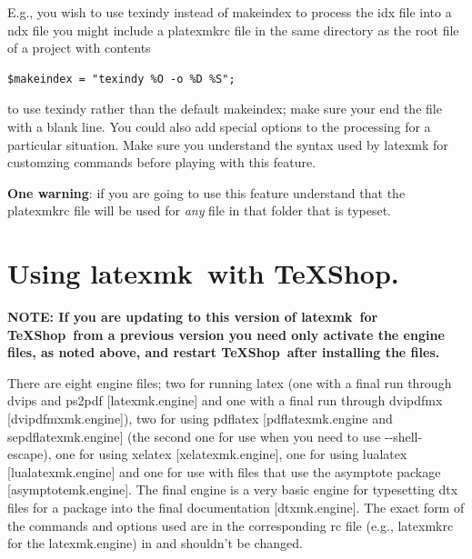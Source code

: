 \documentclass[11pt]{article}
\newcommand{\cmd}[1]{\textsf{#1}}
\newcommand{\TS}{\textsf{\TeX Shop}}
\newcommand{\latexmk}{\textsf{latexmk}}
\begin{document}
E.g., you wish to use \cmd{texindy} instead of \cmd{makeindex} to process the \cmd{idx} file into a \cmd{ndx} file you might include a \cmd{platexmkrc} file in the same directory as the root file of a project with contents
\begin{verbatim}
$makeindex = "texindy %O -o %D %S";
\end{verbatim}
to use \cmd{texindy} rather than the default \cmd{makeindex}; make sure your end the file with a blank line. You could also add special options to the processing for a particular situation. Make sure you understand the syntax used by \cmd{latexmk} for customzing commands before playing with this feature.

\textbf{One warning}: if you are going to use this feature understand that the \cmd{platexmkrc} file will be used for \emph{any} file in that folder that is typeset.

\section{Using \latexmk\ with \TS.}

\textbf{NOTE: If you are updating to this version of \latexmk\ for \TS\ from a previous version you need only activate the engine files, as noted above, and restart \TS\ after installing the files.}

There are eight \cmd{engine} files; two for running \cmd{latex} (one with a final run through \cmd{dvips} and \cmd{ps2pdf} [\cmd{latexmk.engine}] and one with a final run through \cmd{dvipdfmx} [\cmd{dvipdfmxmk.engine]}), two for using \cmd{pdflatex} [\cmd{pdflatexmk.engine} and \cmd{sepdflatexmk.engine}] (the second one for use when you need to use \cmd{-{}-shell-escape}), one for using \cmd{xelatex} [\cmd{xelatexmk.engine}], one for using \cmd{lualatex} [\cmd{lualatexmk.engine}] and one for use with files that use the \cmd{asymptote} package [\cmd{asymptotemk.engine}]. The final engine is a very basic engine for typesetting \cmd{dtx} files for a package into the final documentation [\cmd{dtxmk.engine}]. The exact form of the commands and options used are in the corresponding \cmd{rc} file (e.g., \cmd{latexmkrc} for the \cmd{latexmk.engine}) in  and shouldn't be changed.
\end{document}
